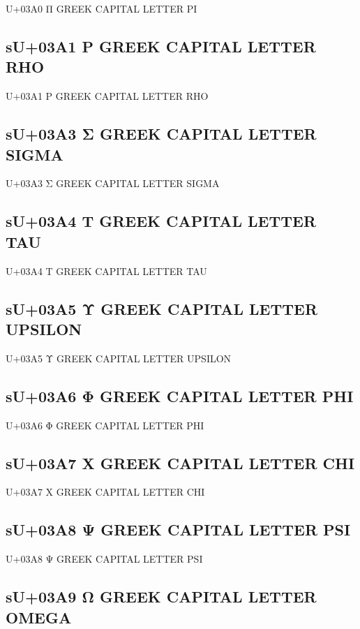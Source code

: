 U+03A0 Π GREEK CAPITAL LETTER PI

\subsection{sU+03A1 Ρ GREEK CAPITAL LETTER RHO}

U+03A1 Ρ GREEK CAPITAL LETTER RHO

\subsection{sU+03A3 Σ GREEK CAPITAL LETTER SIGMA}

U+03A3 Σ GREEK CAPITAL LETTER SIGMA

\subsection{sU+03A4 Τ GREEK CAPITAL LETTER TAU}

U+03A4 Τ GREEK CAPITAL LETTER TAU

\subsection{sU+03A5 Υ GREEK CAPITAL LETTER UPSILON}

U+03A5 Υ GREEK CAPITAL LETTER UPSILON

\subsection{sU+03A6 Φ GREEK CAPITAL LETTER PHI}

U+03A6 Φ GREEK CAPITAL LETTER PHI

\subsection{sU+03A7 Χ GREEK CAPITAL LETTER CHI}

U+03A7 Χ GREEK CAPITAL LETTER CHI

\subsection{sU+03A8 Ψ GREEK CAPITAL LETTER PSI}

U+03A8 Ψ GREEK CAPITAL LETTER PSI

\subsection{sU+03A9 Ω GREEK CAPITAL LETTER OMEGA}

